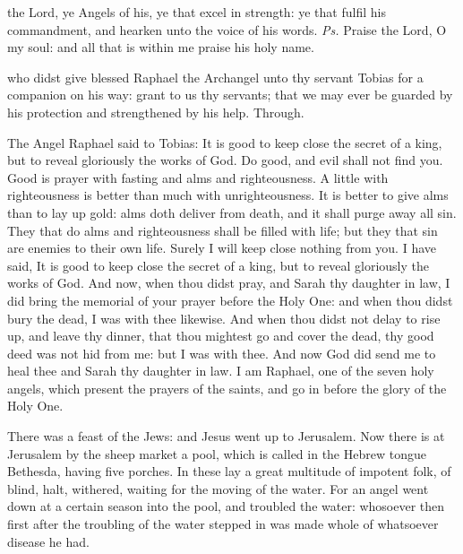 \clearpage
{}

\introit
{} the Lord, ye Angels of his, ye that excel in strength: ye that fulfil his commandment, and hearken unto the voice of his words. \textit{Ps.} Praise the Lord, O my soul: and all that is within me praise his holy name.

\collect
{} who didst give blessed Raphael the Archangel unto thy servant Tobias for a companion on his way: grant to us thy servants; that we may ever be guarded by his protection and strengthened by his help. Through.

 The Angel Raphael said to Tobias: It is good to keep close the secret of a king, but to reveal gloriously the works of God. Do good, and evil shall not find you. Good is prayer with fasting and alms and righteousness. A little with righteousness is better than much with unrighteousness. It is better to give alms than to lay up gold: alms doth deliver from death, and it shall purge away all sin. They that do alms and righteousness shall be filled with life; but they that sin are enemies to their own life. Surely I will keep close nothing from you. I have said, It is good to keep close the secret of a king, but to reveal gloriously the works of God. And now, when thou didst pray, and Sarah thy daughter in law, I did bring the memorial of your prayer before the Holy One: and when thou didst bury the dead, I was with thee likewise.  And when thou didst not delay to rise up, and leave thy dinner, that thou mightest go and cover the dead, thy good deed was not hid from me: but I was with thee. And now God did send me to heal thee and Sarah thy daughter in law. I am Raphael, one of the seven holy angels, which present the prayers of the saints, and go in before the glory of the Holy One. 


 There was a feast of the Jews: and Jesus went up to Jerusalem. Now there is at Jerusalem by the sheep market a pool, which is called in the Hebrew tongue Bethesda, having five porches. In these lay a great multitude of impotent folk, of blind, halt, withered, waiting for the moving of the water. For an angel went down at a certain season into the pool, and troubled the water: whosoever then first after the troubling of the water stepped in was made whole of whatsoever disease he had.

